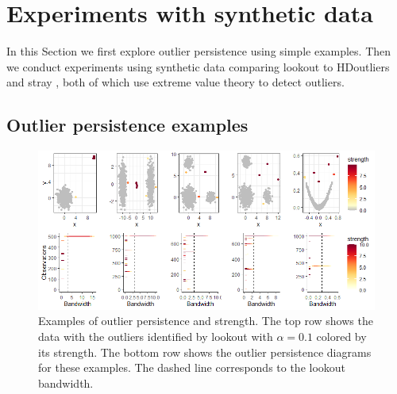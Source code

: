 \documentclass[11pt,a4paper,]{article}
\theoremstyle{definition}
\theoremstyle{definition}
\theoremstyle{definition}
\theoremstyle{remark}
\begin{document}
\hypertarget{experiments-with-synthetic-data}{%
\section{\texorpdfstring{Experiments with synthetic data \label{sec:simulations}}{Experiments with synthetic data }}\label{experiments-with-synthetic-data}}

In this Section we first explore outlier persistence using simple examples. Then we conduct experiments using synthetic data comparing lookout to HDoutliers \autocite{wilkinson2017visualizing} and stray \autocite{pridiltal}, both of which use extreme value theory to detect outliers.

\hypertarget{outlier-persistence-examples}{%
\subsection{\texorpdfstring{Outlier persistence examples \label{sec:PersistenceExamples}}{Outlier persistence examples }}\label{outlier-persistence-examples}}

\begin{figure}[!ht]
    \centering
    \includegraphics[scale=0.7]{../Graphics/Persistence_Ex1.png}
    \caption{Examples of outlier persistence and strength. The top row shows the data with the outliers identified by lookout with $\alpha = 0.1$ colored by its strength. The bottom row shows the outlier persistence diagrams for these examples. The dashed line corresponds to the lookout bandwidth. }
    \label{fig:persistenceExamples}
\end{figure}
\end{document}
